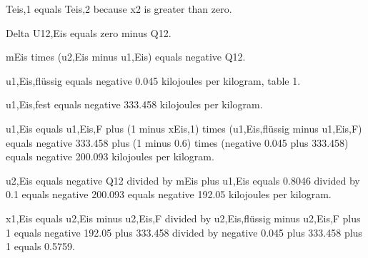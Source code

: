 Teis,1 equals Teis,2 because x2 is greater than zero.

Delta U12,Eis equals zero minus Q12.

mEis times (u2,Eis minus u1,Eis) equals negative Q12.

u1,Eis,flüssig equals negative 0.045 kilojoules per kilogram, table 1.

u1,Eis,fest equals negative 333.458 kilojoules per kilogram.

u1,Eis equals u1,Eis,F plus (1 minus xEis,1) times (u1,Eis,flüssig minus u1,Eis,F) equals negative 333.458 plus (1 minus 0.6) times (negative 0.045 plus 333.458) equals negative 200.093 kilojoules per kilogram.

u2,Eis equals negative Q12 divided by mEis plus u1,Eis equals 0.8046 divided by 0.1 equals negative 200.093 equals negative 192.05 kilojoules per kilogram.

x1,Eis equals u2,Eis minus u2,Eis,F divided by u2,Eis,flüssig minus u2,Eis,F plus 1 equals negative 192.05 plus 333.458 divided by negative 0.045 plus 333.458 plus 1 equals 0.5759.